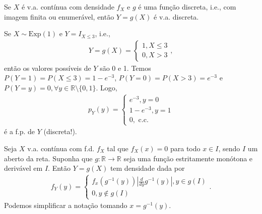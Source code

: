 \documentclass[../Notas.tex]{subfiles}
\begin{document}
\begin{remark}
Se $X$ é v.a. contínua com densidade $f_X$ e $g$ é uma função discreta, i.e., com imagem finita ou enumerável, então $Y=g(X)$ é v.a. discreta.
\end{remark}

\begin{example}
Se $X\sim\text{Exp}(1)$ e $Y = I_{X\leq 3}$, i.e.,
\begin{align*}
    Y = g(X) = \begin{cases}
    1, X\leq 3 \\
    0, X > 3
    \end{cases},
\end{align*}
então os valores possíveis de $Y$ são 0 e 1. Temos $P(Y=1) = P(X\leq 3) = 1 - e^{-3}$, $P(Y=0) = P(X>3) = e^{-3}$ e $P(Y=y) = 0, \forall y\in\mathbb{R}\setminus\{0,1\}$. Logo,
\begin{align*}
    p_Y(y) = \begin{cases}
    e^{-3}, y = 0 \\
    1 - e^{-3}, y = 1 \\
    0, \text{ c.c.}
    \end{cases}
\end{align*}
é a f.p. de $Y$ (discreta!).
\end{example}

\begin{theorem}
Seja $X$ v.a. contínua com f.d. $f_X$ tal que $f_X(x) = 0$ para todo $x\in I$, sendo $I$ um aberto da reta. Suponha que $g:\mathbb{R}\to\mathbb{R}$ seja uma função estritamente monótona e derivável em $I$. Então $Y=g(X)$ tem densidade dada por
\begin{align*}
    f_Y(y) = \begin{cases}
    f_x(g^{-1}(y))\left| \frac{d}{dy}g^{-1}(y) \right|, y\in g(I) \\
    0, y\notin g(I)
    \end{cases}.
\end{align*}
Podemos simplificar a notação tomando $x = g^{-1}(y)$.
\end{theorem}
\end{document}
